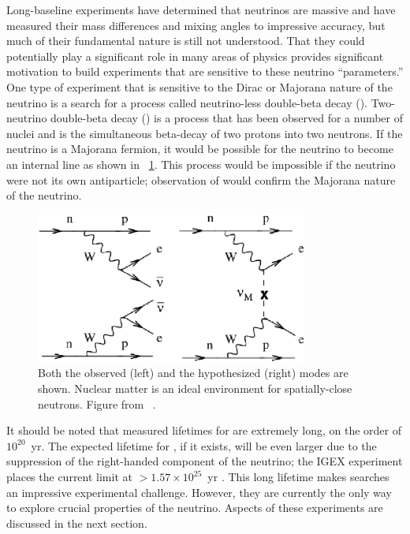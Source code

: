 Long-baseline experiments have determined that neutrinos are massive and have measured their mass differences and mixing angles to impressive accuracy, but much of their fundamental nature is still not understood.  That they could potentially play a significant role in many areas of physics provides significant motivation to build experiments that are sensitive to these neutrino ``parameters.'' One type of experiment that is sensitive to the Dirac or Majorana nature of the neutrino is a search for a process called neutrino-less double-beta decay (\zvbb).  Two-neutrino double-beta decay (\tvbb) is a process that has been observed for a number of nuclei and is the simultaneous beta-decay of two protons into two neutrons.  If the neutrino is a Majorana fermion, it would be possible for the neutrino to become an internal line as shown in {\fig}~\ref{fig:zvbb}.  This process would be impossible if the neutrino were not its own antiparticle; observation of \zvbb would confirm the Majorana nature of the neutrino. 
\begin{figure}[htp]
\centering
\includegraphics[width=0.8\textwidth]{figures/feynman2.eps}
\caption{Both the observed \tvbb (left) and the hypothesized \zvbb (right) modes are shown.  Nuclear matter is an ideal environment for spatially-close neutrons.  Figure from {}~\cite{zvbbReview_Elliott}.}
\label{fig:zvbb}
\end{figure}
It should be noted that measured lifetimes for \tvbb are extremely long, on the order of $10^{20}$~yr.  The expected lifetime for \zvbb, if it exists, will be even larger due to the suppression of the right-handed component of the neutrino; the IGEX experiment places the current limit at $>1.57\times 10^{25}$~yr \cite{IGEX}.  This long lifetime makes \zvbb searches an impressive experimental challenge.  However, they are currently the only way to explore crucial properties of the neutrino.  Aspects of these experiments are discussed in the next section.

